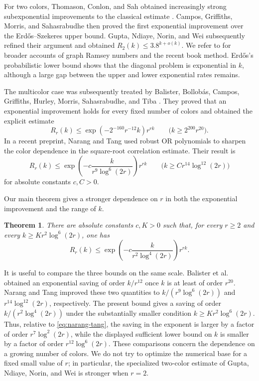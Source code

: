 \documentclass[twoside,12pt]{article}
\newtheorem{theorem}{Theorem}[section]
\theoremstyle{definition}
\theoremstyle{remark}
\newcommand{\1}{\mathbf 1}
\begin{document}
For two colors, Thomason, Conlon, and Sah obtained increasingly strong
subexponential improvements to the classical estimate
\cite{Conlon2009,Sah2023,Thomason1988}. Campos, Griffiths, Morris, and
Sahasrabudhe \cite{CamposEtAl2026} then proved the first exponential
improvement over the Erd\H{o}s--Szekeres upper bound. Gupta, Ndiaye, Norin,
and Wei \cite{GuptaEtAl2024} subsequently refined their argument and obtained
$R_2(k)\le3.8^{k+o(k)}$. We refer to
\cite{ConlonFoxSudakov2015,Wigderson2025} for broader accounts of graph
Ramsey numbers and the recent book method. Erd\H{o}s's probabilistic lower
bound \cite{Erdos1947} shows that the diagonal problem is exponential in
$k$, although a large gap between the upper and lower exponential rates
remains.

The multicolor case was subsequently treated by Balister, Bollob\'as,
Campos, Griffiths, Hurley, Morris, Sahasrabudhe, and Tiba
\cite{BalisterEtAl2026}. They proved that an exponential improvement holds
for every fixed number of colors and obtained the explicit estimate
\[
 R_r(k)\le \exp\!\left(-2^{-160}r^{-12}k\right)r^{rk}
 \qquad\bigl(k\ge 2^{200}r^{20}\bigr).
\]
In a recent preprint, Narang and Tang \cite{NarangTang2026} used robust OR
polynomials to sharpen the color dependence in the square-root correlation
estimate. Their result is
\begin{equation}\label{eq:narang-tang}
 R_r(k)\le
 \exp\!\left(-c\frac{k}{r^9\log^6(2r)}\right)r^{rk}
 \qquad\bigl(k\ge Cr^{14}\log^{12}(2r)\bigr)
\end{equation}
for absolute constants $c,C>0$.

Our main theorem gives a stronger dependence on $r$ in both the exponential
improvement and the range of $k$.

\begin{theorem}\label{thm:main}
There are absolute constants $c,K>0$ such that, for every $r\ge2$ and every
$k\ge Kr^2\log^6(2r)$, one has
\[
 R_r(k)\le
 \exp\!\left(-c\frac{k}{r^2\log^4(2r)}\right)r^{rk}.
\]
\end{theorem}

It is useful to compare the three bounds on the same scale. Balister et al.
obtained an exponential saving of order $k/r^{12}$ once $k$ is at least of
order $r^{20}$. Narang and Tang improved these two quantities to
$k/(r^9\log^6(2r))$ and $r^{14}\log^{12}(2r)$, respectively. The present
bound gives a saving of order $k/(r^2\log^4(2r))$ under the substantially
smaller condition $k\ge Kr^2\log^6(2r)$. Thus, relative to
\eqref{eq:narang-tang}, the saving in the exponent is larger by a factor of
order $r^7\log^2(2r)$, while the displayed sufficient lower bound on $k$ is
smaller by a factor of order $r^{12}\log^6(2r)$. These comparisons concern
the dependence on a growing number of colors. We do not try to optimize the
numerical base for a fixed small value of $r$; in particular, the specialized
two-color estimate of Gupta, Ndiaye, Norin, and Wei is stronger when $r=2$.
\end{document}
